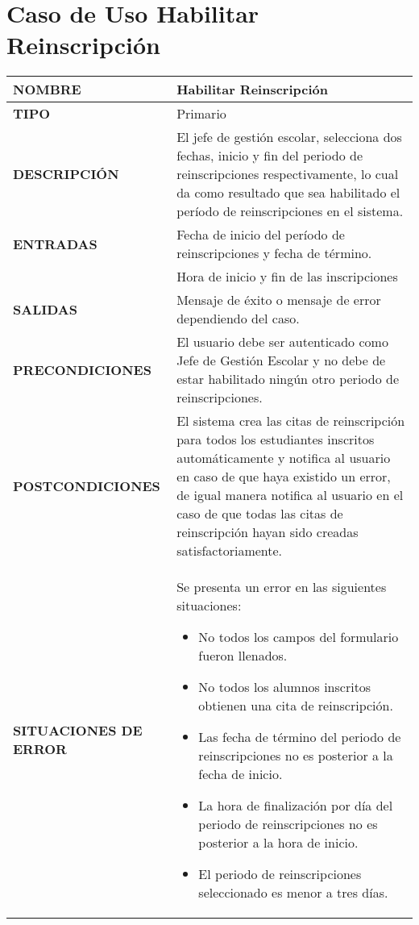 \newpage
\section{Caso de Uso Habilitar Reinscripción}
\begin{longtable}{ | p{6cm} | p{10cm} |}
    \hline
    \textbf{NOMBRE} & Habilitar Reinscripción\\
    \hline
    \textbf{TIPO} & Primario\\
    \hline
    \textbf{DESCRIPCIÓN} & El jefe de gestión escolar, selecciona dos fechas, inicio y fin del periodo de reinscripciones respectivamente, lo cual da como resultado que sea habilitado el período de reinscripciones en el sistema.\\
    \hline
    \textbf{ENTRADAS} & Fecha de inicio del período de reinscripciones y fecha de término.\\&Hora de inicio y fin de las inscripciones\\
    \hline
    \textbf{SALIDAS} & Mensaje de éxito o mensaje de error dependiendo del caso.\\
    \hline
    \textbf{PRECONDICIONES} & El usuario debe ser autenticado como Jefe de Gestión Escolar y no debe de estar habilitado ningún otro periodo de reinscripciones.\\
    \hline
    \textbf{POSTCONDICIONES} & El sistema crea las citas de reinscripción para todos los estudiantes inscritos automáticamente y notifica al usuario en caso de que haya existido un error, de igual manera notifica al usuario en el caso de que todas las citas de reinscripción hayan sido creadas satisfactoriamente.\\
    \hline
    \textbf{SITUACIONES DE ERROR} &Se presenta un error en las siguientes situaciones:
    \begin{itemize}
        \item No todos los campos del formulario fueron llenados.
    	\item No todos los alumnos inscritos obtienen una cita de reinscripción.
    	\item Las fecha de término del periodo de reinscripciones no es posterior a la fecha de inicio.
    	\item La hora de finalización por día del periodo de reinscripciones no es posterior a la hora de inicio.
    	\item El periodo de reinscripciones seleccionado es menor a tres días.
    \end{itemize}\\
    \hline

\end{longtable}
